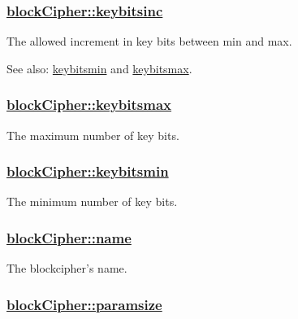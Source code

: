\hypertarget{structblockCipher_o5}{
\subsubsection[keybitsinc]{\setlength{\rightskip}{0pt plus 5cm}\hyperlink{structblockCipher_o5}{block\-Cipher::keybitsinc}}}
\label{structblockCipher_o5}


The allowed increment in key bits between min and max. 

\begin{Desc}
\item[See also:]\hyperlink{structblockCipher_o3}{keybitsmin} and \hyperlink{structblockCipher_o4}{keybitsmax}. \end{Desc}
\hypertarget{structblockCipher_o4}{
\subsubsection[keybitsmax]{\setlength{\rightskip}{0pt plus 5cm}\hyperlink{structblockCipher_o4}{block\-Cipher::keybitsmax}}}
\label{structblockCipher_o4}


The maximum number of key bits. 

\hypertarget{structblockCipher_o3}{
\subsubsection[keybitsmin]{\setlength{\rightskip}{0pt plus 5cm}\hyperlink{structblockCipher_o3}{block\-Cipher::keybitsmin}}}
\label{structblockCipher_o3}


The minimum number of key bits. 

\hypertarget{structblockCipher_o0}{
\subsubsection[name]{\setlength{\rightskip}{0pt plus 5cm}\hyperlink{structblockCipher_o0}{block\-Cipher::name}}}
\label{structblockCipher_o0}


The blockcipher's name. 

\hypertarget{structblockCipher_o1}{
\subsubsection[paramsize]{\setlength{\rightskip}{0pt plus 5cm}\hyperlink{structblockCipher_o1}{block\-Cipher::paramsize}}}
\label{structblockCipher_o1}


